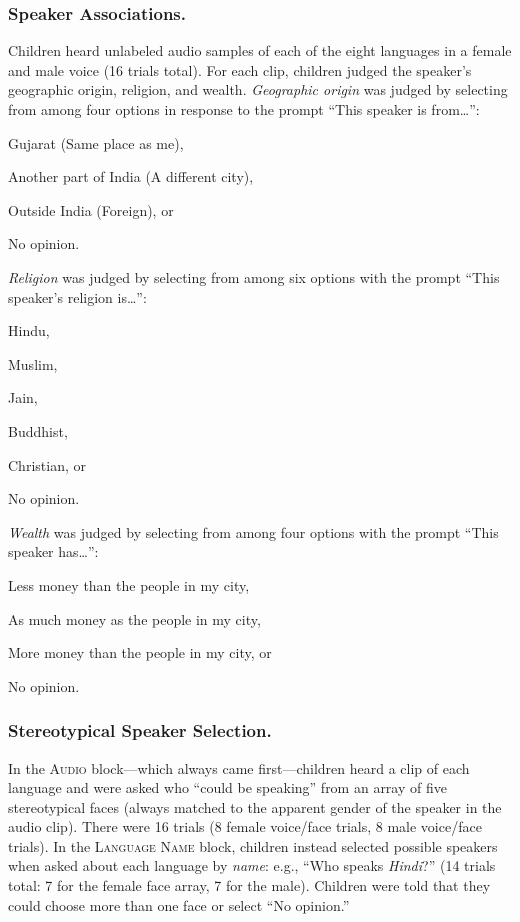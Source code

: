 \documentclass{foushee-adapted-preprint}
\begin{document}
\subsubsection{Speaker Associations.}
Children heard unlabeled audio samples of each of the eight languages in a female and male voice (16 trials total). 
For each clip, children judged the speaker's geographic origin, religion, and wealth. 
\textit{Geographic origin} was judged by selecting from among four options in response to the prompt ``This speaker is from\ldots'': 
\begin{inparaenum}[(a)]
    \item Gujarat (Same place as me),
    \item Another part of India (A different city),
    \item Outside India (Foreign), or
    \item No opinion. 
\end{inparaenum}
\textit{Religion} was judged by selecting from among six options with the prompt ``This speaker's religion is\ldots'': 
\begin{inparaenum}[(a)]
    \item Hindu,
    \item Muslim,
    \item Jain,
    \item Buddhist,
    \item Christian, or
    \item No opinion. 
\end{inparaenum}
\textit{Wealth} was judged by selecting from among four options with the prompt ``This speaker has\ldots'': 
\begin{inparaenum}[(a)]
    \item Less money than the people in my city,
    \item As much money as the people in my city,
    \item More money than the people in my city, or 
    \item No opinion. 
\end{inparaenum}

\subsubsection{Stereotypical Speaker Selection.}
In the \textsc{Audio} block---which always came first---children heard a clip of each language and were asked who ``could be speaking'' from an array of five stereotypical faces (always matched to the apparent gender of the speaker in the audio clip). 
There were 16 trials (8 female voice/face trials, 8 male voice/face trials). 
In the \textsc{Language Name} block, children instead selected possible speakers when asked about each language by \textit{name}: e.g., ``Who speaks \textit{Hindi}?'' (14 trials total: 7 for the female face array, 7 for the male). 
Children were told that they could choose more than one face or select ``No opinion.'' 
\end{document}
